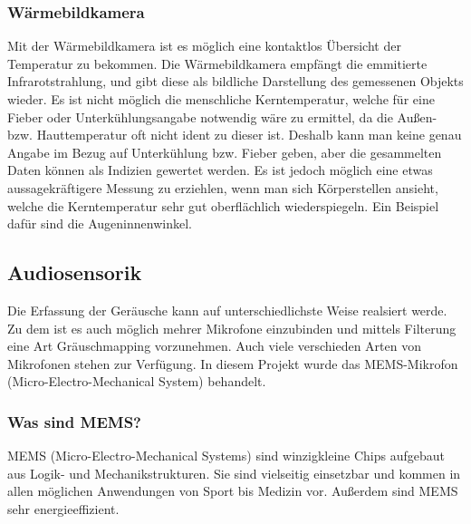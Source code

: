 \subsubsection{Wärmebildkamera}
Mit der Wärmebildkamera ist es möglich eine kontaktlos Übersicht der Temperatur zu bekommen. Die Wärmebildkamera empfängt die emmitierte 
Infrarotstrahlung, und gibt diese als bildliche Darstellung des gemessenen Objekts wieder. Es ist nicht möglich die menschliche Kerntemperatur, welche
für eine Fieber oder Unterkühlungsangabe notwendig wäre zu ermittel, da die Außen- bzw. Hauttemperatur oft nicht ident zu dieser ist. Deshalb kann man
keine genau Angabe im Bezug auf Unterkühlung bzw. Fieber  geben, aber die gesammelten Daten können als Indizien gewertet werden. 
Es ist jedoch möglich eine etwas aussagekräftigere Messung zu erziehlen, wenn man sich Körperstellen ansieht, welche die Kerntemperatur sehr gut 
oberflächlich wiederspiegeln. Ein Beispiel dafür sind die Augeninnenwinkel. \cite{jenoptik_waermebildkamera}
 
\subsection[Audiosensorik]{Audiosensorik\authorkatrin }
Die Erfassung der Geräusche kann auf unterschiedlichste Weise realsiert werde. Zu dem ist es auch möglich mehrer Mikrofone einzubinden und mittels Filterung eine Art Gräuschmapping 
vorzunehmen. Auch viele verschieden Arten von Mikrofonen stehen zur Verfügung. In diesem Projekt wurde das MEMS-Mikrofon (Micro-Electro-Mechanical System) behandelt. 
\subsubsection{Was sind MEMS?}
MEMS (Micro-Electro-Mechanical Systems) sind winzigkleine Chips aufgebaut aus Logik- und Mechanikstrukturen. Sie sind vielseitig einsetzbar 
und kommen in allen möglichen Anwendungen von Sport bis Medizin vor. Außerdem sind 
MEMS sehr energieeffizient. \cite{elektronikkompendium_mems} \cite{mems_wikipedia} 
